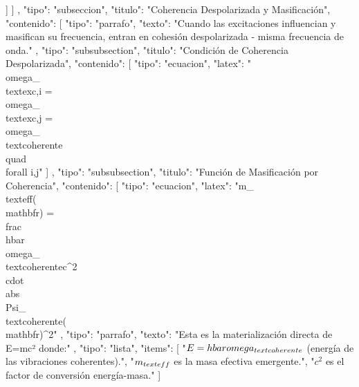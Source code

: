 \documentclass{article}
\begin{document}
{{{{{                }
              ]
            }
          ]
        },
        {
          "tipo": "subseccion",
          "titulo": "Coherencia Despolarizada y Masificación",
          "contenido": [
            {
              "tipo": "parrafo",
              "texto": "Cuando las excitaciones influencian y masifican su frecuencia, entran en cohesión despolarizada - misma frecuencia de onda."
            },
            {
              "tipo": "subsubsection",
              "titulo": "Condición de Coherencia Despolarizada",
              "contenido": [
                {
                  "tipo": "ecuacion",
                  "latex": "\\omega_{\\text{exc},i} = \\omega_{\\text{exc},j} = \\omega_{\\text{coherente}} \\quad \\forall i,j"
                }
              ]
            },
            {
              "tipo": "subsubsection",
              "titulo": "Función de Masificación por Coherencia",
              "contenido": [
                {
                  "tipo": "ecuacion",
                  "latex": "m_{\\text{eff}}(\\mathbf{r}) = \\frac{\\hbar\\omega_{\\text{coherente}}}{c^2} \\cdot \\abs{\\Psi_{\\text{coherente}}(\\mathbf{r})}^2"
                },
                {
                  "tipo": "parrafo",
                  "texto": "Esta es la materialización directa de E=mc² donde:"
                },
                {
                  "tipo": "lista",
                  "items": [
                    "$E = \\hbar\\omega_{\\text{coherente}}$ (energía de las vibraciones coherentes).",
                    "$m_{\\text{eff}}$ es la masa efectiva emergente.",
                    "$c^2$ es el factor de conversión energía-masa."
                  ]
                }
}}}}
\end{document}

